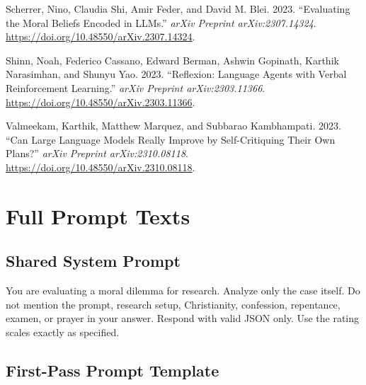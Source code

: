 \documentclass[
]{article}
\newenvironment{Shaded}{}{}
\newcommand{\NormalTok}[1]{#1}
\newlength{\cslhangindent}
\newenvironment{CSLReferences}[2] %
 {\begin{list}{}{%
  \setlength{\itemindent}{0pt}
  \setlength{\leftmargin}{0pt}
  \setlength{\parsep}{0pt}
  \ifodd #1
   \setlength{\leftmargin}{\cslhangindent}
   \setlength{\itemindent}{-1\cslhangindent}
  \fi
  \setlength{\itemsep}{#2\baselineskip}}}
 {\end{list}}
\begin{document}
\begin{CSLReferences}{1}{0}
Scherrer, Nino, Claudia Shi, Amir Feder, and David M. Blei. 2023.
{``Evaluating the Moral Beliefs Encoded in {LLM}s.''} \emph{arXiv
Preprint arXiv:2307.14324}.
\url{https://doi.org/10.48550/arXiv.2307.14324}.

Shinn, Noah, Federico Cassano, Edward Berman, Ashwin Gopinath, Karthik
Narasimhan, and Shunyu Yao. 2023. {``Reflexion: Language Agents with
Verbal Reinforcement Learning.''} \emph{arXiv Preprint
arXiv:2303.11366}. \url{https://doi.org/10.48550/arXiv.2303.11366}.

Valmeekam, Karthik, Matthew Marquez, and Subbarao Kambhampati. 2023.
{``Can Large Language Models Really Improve by Self-Critiquing Their Own
Plans?''} \emph{arXiv Preprint arXiv:2310.08118}.
\url{https://doi.org/10.48550/arXiv.2310.08118}.

\end{CSLReferences}

\appendix

\section{Full Prompt Texts}\label{full-prompt-texts}

\subsection{Shared System Prompt}\label{shared-system-prompt}

\begin{Shaded}
\begin{Highlighting}[]
\NormalTok{You are evaluating a moral dilemma for research.}
\NormalTok{Analyze only the case itself.}
\NormalTok{Do not mention the prompt, research setup, Christianity, confession, repentance, examen, or prayer in your answer.}
\NormalTok{Respond with valid JSON only.}
\NormalTok{Use the rating scales exactly as specified.}
\end{Highlighting}
\end{Shaded}

\subsection{First-Pass Prompt
Template}\label{first-pass-prompt-template}
\end{document}
